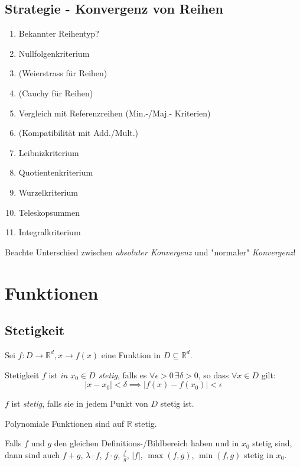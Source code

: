 \documentclass[a4paper,10pt]{article}
\def\limn{\lim_{n\to \infty}}
\def\R{\mathbb{R}}
\begin{document}
\subsection{Strategie - Konvergenz von Reihen}
\begin{enumerate}
    \item Bekannter Reihentyp?
    \item Nullfolgenkriterium
    \item (Weierstrass für Reihen)
    \item (Cauchy für Reihen)
    \item Vergleich mit Referenzreihen (Min.-/Maj.- Kriterien)
    \item (Kompatibilität mit Add./Mult.)
    \item Leibnizkriterium
    \item Quotientenkriterium
    \item Wurzelkriterium
    \item Teleskopsummen
    \item Integralkriterium
\end{enumerate}
Beachte Unterschied zwischen \emph{absoluter Konvergenz} und "normaler" \emph{Konvergenz}!

\section{Funktionen}
\subsection{Stetigkeit}
Sei $f : D \to \R^d, x \to f(x)$ eine Funktion in $D \subseteq \R^d$.
\begin{mainbox}{Stetigkeit}
 $f$ ist \emph{in $x_0 \in D$ stetig}, falls es $\forall \epsilon > 0 \, \exists \delta > 0$, so dass $\forall x \in D$ gilt:
 \[ \left| x - x_0 \right| < \delta \implies \left| f(x) - f(x_0) \right| < \epsilon \]
 
 $f$ ist \emph{stetig}, falls sie in jedem Punkt von $D$ stetig ist.
\end{mainbox}
Polynomiale Funktionen sind auf $\R$ stetig.
\begin{subbox}{}
 Falls $f$ und $g$ den gleichen Definitions-/Bildbereich haben und in $x_0$ stetig sind, dann sind auch $f + g$, $\lambda \cdot f$, $f \cdot g$, $\frac{f}{g}$, $|f|$, $\max(f,g)$, $\min(f,g)$ stetig in $x_0$.
\end{subbox}
\end{document}
